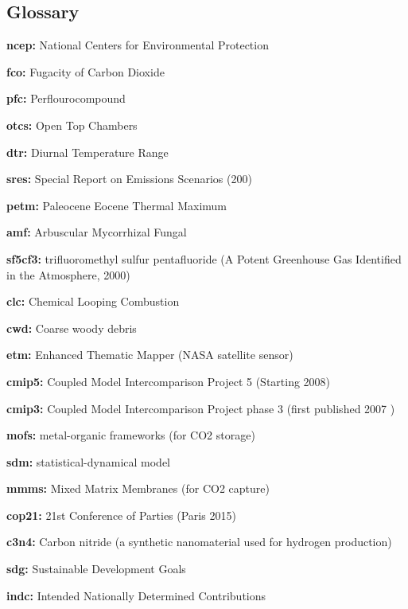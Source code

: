 \documentclass{article}
\begin{document}
\begin{linenumbers}
\subsection*{Glossary}


\noindent\textbf{ncep:} National Centers for Environmental Protection

\noindent\textbf{fco:} Fugacity of Carbon Dioxide

\noindent\textbf{pfc:} Perflourocompound

\noindent\textbf{otcs:} Open Top Chambers

\noindent\textbf{dtr:} Diurnal Temperature Range

\noindent\textbf{sres:} Special Report on Emissions Scenarios (200)

\noindent\textbf{petm:} Paleocene Eocene Thermal Maximum

\noindent\textbf{amf:}  Arbuscular Mycorrhizal Fungal

\noindent\textbf{sf5cf3:} trifluoromethyl sulfur pentafluoride (A Potent Greenhouse Gas Identified in the Atmosphere, 2000)

\noindent\textbf{clc:} Chemical Looping Combustion

\noindent\textbf{cwd:} Coarse woody debris

\noindent\textbf{etm:} Enhanced Thematic Mapper (NASA satellite sensor)

\noindent\textbf{cmip5:} Coupled Model Intercomparison Project 5 (Starting 2008)

\noindent\textbf{cmip3:} Coupled Model Intercomparison Project phase 3 (first published 2007 \cite{Meehl2007})

\noindent\textbf{mofs:} metal-organic frameworks (for CO2 storage)

\noindent\textbf{sdm:} statistical-dynamical model

\noindent\textbf{mmms:} Mixed Matrix Membranes (for CO2 capture)

\noindent\textbf{cop21:} 21st Conference of Parties (Paris 2015) 

\noindent\textbf{c3n4:} Carbon nitride (a synthetic nanomaterial used for hydrogen production)

\noindent\textbf{sdg:} Sustainable Development Goals

\noindent\textbf{indc:} Intended Nationally Determined Contributions

		
	\end{linenumbers}

\linespread{1}
%
\end{document}
